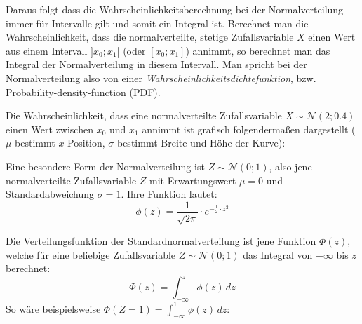 Daraus folgt dass die Wahrscheinlichkeitsberechnung bei der Normalverteilung immer f\"{u}r Intervalle gilt und somit ein Integral ist. Berechnet man die Wahrscheinlichkeit, dass die normalverteilte, stetige Zufallsvariable $X$ einen Wert aus einem Intervall $]x_{0}; x_{1}[$ (oder $[x_{0};x_{1}]$) annimmt, so berechnet man das Integral der Normalverteilung in diesem Intervall. Man spricht bei der Normalverteilung also von einer \emph{Wahrscheinlichkeitsdichtefunktion}, bzw. Probability-density-function (PDF).

Die Wahrscheinlichkeit, dass eine normalverteilte Zufallsvariable $X \sim \mathcal{N}(2; 0.4)$ einen Wert zwischen $x_{0}$ und $x_{1}$ annimmt ist grafisch folgenderma\ss{}en dargestellt ($\mu$ bestimmt $x$-Position, $\sigma$ bestimmt Breite und H\"{o}he der Kurve):

\vspace{0.25cm}

\begin{figure}[h!]
\end{figure}

\pagebreak


Eine besondere Form der Normalverteilung ist $Z \sim \mathcal{N}(0; 1)$, also jene normalverteilte Zufallsvariable $Z$ mit Erwartungswert $\mu = 0$ und Standardabweichung $\sigma = 1$. Ihre Funktion lautet: $$\phi(z) = \frac{1}{\sqrt{2\pi}} \cdot e^{-\frac{1}{2} \cdot z^2}$$

Die Verteilungsfunktion der Standardnormalverteilung ist jene Funktion $\Phi(z)$, welche f\"{u}r eine beliebige Zufallsvariable $Z \sim \mathcal{N}(0; 1)$ das Integral von $-\infty$ bis $z$ berechnet: $$\Phi(z) = \int_{-\infty}^{z} \phi(z) \, dz$$ So w\"{a}re beispielsweise $\Phi(Z=1) = \int_{-\infty}^{1} \phi(z) \, dz$:

